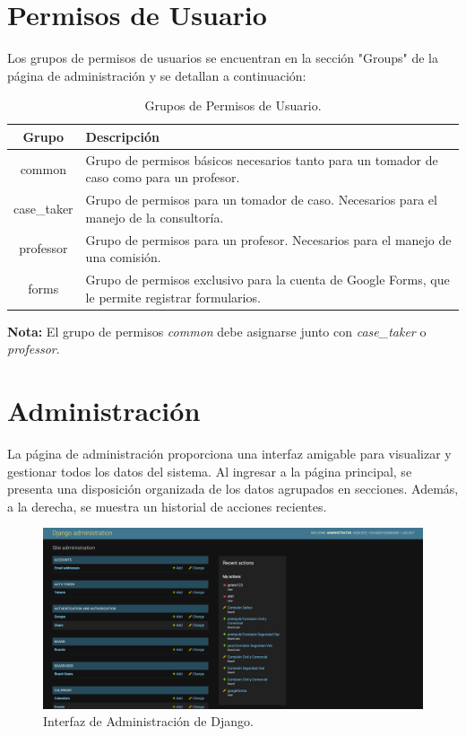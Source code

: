 \section{Permisos de Usuario}\label{sec:permisos-usuarios}

Los grupos de permisos de usuarios se encuentran en la sección "Groups" de la página de administración y se detallan a continuación:

\begin{table}[H]
    \centering
    \begin{tabular}{|c|p{10cm}|}
        \hline
        \textbf{Grupo} & \textbf{Descripción}\\
        \hline
        common & Grupo de permisos básicos necesarios tanto para un tomador de caso como para un profesor.\\
        \hline
        case_taker & Grupo de permisos para un tomador de caso. Necesarios para el manejo de la consultoría.\\
        \hline
        professor & Grupo de permisos para un profesor. Necesarios para el manejo de una comisión.\\
        \hline
        forms & Grupo de permisos exclusivo para la cuenta de Google Forms, que le permite registrar formularios.\\
        \hline
    \end{tabular}
    \caption{Grupos de Permisos de Usuario.}
    \label{tab:grupos-permisos-usuario}
\end{table}

\textbf{Nota:} El grupo de permisos \textit{common} debe asignarse junto con \textit{case\_taker} o \textit{professor}.


\section{Administración}\label{sec:administracion}

La página de administración proporciona una interfaz amigable para visualizar y gestionar todos los datos del sistema. Al ingresar a la página principal, se presenta una disposición organizada de los datos agrupados en secciones. Además, a la derecha, se muestra un historial de acciones recientes.

\begin{figure}[H]
    \centering
    \includegraphics[width=1\linewidth]{fig/administracion.png}
    \caption{Interfaz de Administración de Django.}
    \label{fig:admin-interface}
\end{figure}

